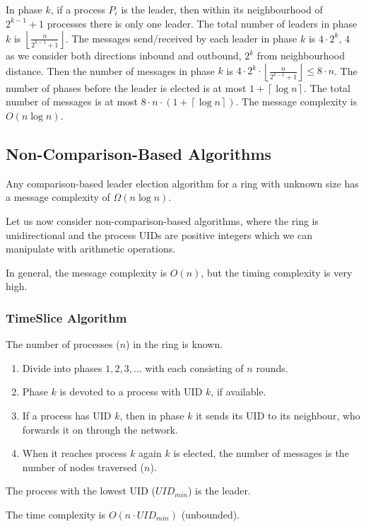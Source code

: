 \documentclass[11pt]{article}
\begin{document}
In phase $k$, if a process $P_i$ is the leader, then within its neighbourhood of $2^{k - 1} + 1$ processes there is only one leader.
The total number of leaders in phase $k$ is $\left\lfloor \frac{n}{2^{k - 1} + 1} \right\rfloor$.
The messages send/received by each leader in phase $k$ is $4 \cdot 2^k$, $4$ as we consider both directions inbound and outbound, $2^k$ from neighbourhood distance.
Then the number of messages in phase $k$ is $4 \cdot 2^k \cdot \left\lfloor \frac{n}{2^{k-1}+1}\right\rfloor \leq 8 \cdot n$.
The number of phases before the leader is elected is at most $1 + \left\lceil \log n \right\rceil$.
The total number of messages is at most $8 \cdot n \cdot (1 + \left\lceil \log n \right\rceil)$.
The message complexity is $O(n \log n)$.

\subsection{Non-Comparison-Based Algorithms}
Any comparison-based leader election algorithm for a ring with unknown size has a message complexity of $\Omega(n \log n)$.

Let us now consider non-comparison-based algorithms, where the ring is unidirectional and the process UIDs are positive integers which we can manipulate with arithmetic operations.

In general, the message complexity is $O(n)$, but the timing complexity is very high.

\subsubsection{TimeSlice Algorithm}
The number of processes ($n$) in the ring is known.
\begin{enumerate}
  \item Divide into phases $1,2,3, \dots$ with each consisting of $n$ rounds.
  \item Phase $k$ is devoted to a process with UID $k$, if available.
  \item If a process has UID $k$, then in phase $k$ it sends its UID to its neighbour, who forwards it on through the network.
  \item When it reaches process $k$ again $k$ is elected, the number of messages is the number of nodes traversed ($n$).
\end{enumerate}
The process with the lowest UID ($UID_{min}$) is the leader.

The time complexity is $O(n \cdot UID_{min})$ (unbounded).
\end{document}
